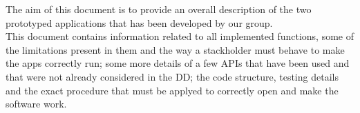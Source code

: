 The aim of this document is to provide an overall description of the two prototyped applications that has been developed by our group.\\
This document contains information related to all implemented functions, some of the limitations present in them and the way a stackholder must behave to make the apps correctly run; some more details of a few APIs that have been used and that were not already considered in the DD; the code structure, testing details and the exact procedure that must be applyed to correctly open and make the software work.\\